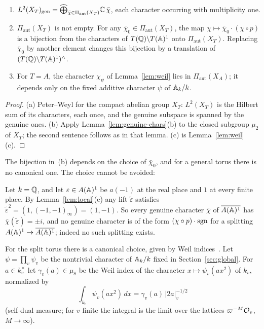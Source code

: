 \begin{theorem}\label{thm:corr}
\begin{enumerate}[label=(\alph*)]
\item $L^2(X_T)_{\mathrm{gen}}=\widehat\bigoplus_{\bar\chi\in
  \Pi_{\mathrm{aut}}(X_T)}\mathbb{C}\,\bar\chi$, each character occurring with
  multiplicity one.
\item $\Pi_{\mathrm{aut}}(X_T)$ is not empty. For any
  $\bar\chi_0\in\Pi_{\mathrm{aut}}(X_T)$, the map
  $\chi\mapsto\bar\chi_0\cdot(\chi\circ p)$ is a bijection from the
  characters of $T(\mathbb{Q})\backslash T(\mathbb{A})^1$ onto $\Pi_{\mathrm{aut}}(X_T)$.
  Replacing $\bar\chi_0$ by another element changes this bijection by a
  translation of $(T(\mathbb{Q})\backslash T(\mathbb{A})^1)^\wedge$.
\item For $T=A$, the character $\chi_\psi$ of Lemma~\ref{lem:weil} lies
  in $\Pi_{\mathrm{aut}}(X_A)$; it depends only on the fixed additive
  character $\psi$ of $\mathbb{A}_k/k$.
\end{enumerate}
\end{theorem}

\begin{proof}
(a) Peter--Weyl for the compact abelian group $X_T$: $L^2(X_T)$ is the
Hilbert sum of its characters, each once, and the genuine subspace is
spanned by the genuine ones. (b) Apply Lemma~\ref{lem:genuine-chars}(b)
to the closed subgroup $\mu_2$ of $X_T$; the second sentence follows
as in that lemma. (c) is Lemma~\ref{lem:weil}(c).
\end{proof}

The bijection in~(b) depends on the choice of $\bar\chi_0$, and for a
general torus there is no canonical one. The choice cannot be avoided:

\begin{example}\label{ex:order4}
Let $k=\mathbb{Q}$, and let $\varepsilon\in A(\mathbb{A})^1$ be $a(-1)$ at the real place
and $1$ at every finite place. By Lemma~\ref{lem:local}(e) any lift
$\tilde\varepsilon$ satisfies $\tilde\varepsilon^2=(1,(-1,-1)_\infty)
=(1,-1)$. So every genuine character $\bar\chi$ of $\overline{A(\mathbb{A})^1}$
has $\bar\chi(\tilde\varepsilon)=\pm i$, and no genuine character is of
the form $(\chi\circ p)\cdot\operatorname{sgn}$ for a splitting $A(\mathbb{A})^1\to
\overline{A(\mathbb{A})^1}$; indeed no such splitting exists.
\end{example}

For the split torus there is a canonical choice, given by Weil
indices~\cite{We64}. Let $\psi=\prod_v\psi_v$ be the nontrivial
character of $\mathbb{A}_k/k$ fixed in Section~\ref{sec:global}. For $a\in
k_v^\times$ let $\gamma_v(a)\in\mu_8$ be the Weil index of the character
$x\mapsto\psi_v(ax^2)$ of $k_v$, normalized by
\begin{equation}\label{eq:weil-index}
\int_{k_v}\psi_v(ax^2)\,dx=\gamma_v(a)\,|2a|_v^{-1/2}
\end{equation}
(self-dual measure; for $v$ finite the integral is the limit over the
lattices $\varpi^{-M}\mathcal{O}_v$, $M\to\infty$).


